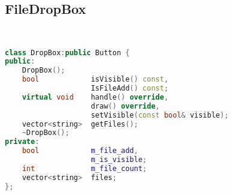 \subsection{FileDropBox}
\begin{lstlisting}[language=C++]


class DropBox:public Button {
public:
    DropBox();
    bool            isVisible() const,
                    IsFileAdd() const;
    virtual void    handle() override,
                    draw() override,
                    setVisible(const bool& visible);
    vector<string>  getFiles();
    ~DropBox();
private:
    bool            m_file_add,
                    m_is_visible;
    int             m_file_count;
    vector<string>  files;
};






\end{lstlisting}
